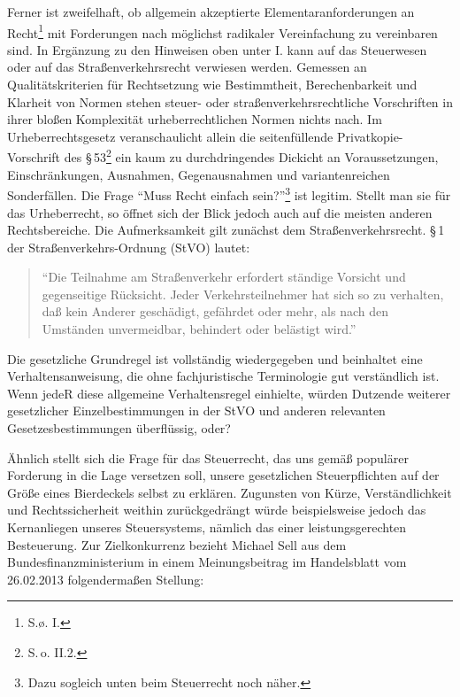 \documentclass[output=paper]{langscibook}
\begin{document}
Ferner ist zweifelhaft, ob allgemein akzeptierte Elementaranforderungen
an Recht\footnote{S.\o. I.} mit Forderungen nach möglichst radikaler
Vereinfachung zu vereinbaren sind. In Ergänzung zu den Hinweisen oben
unter I. kann auf das Steuerwesen oder auf das Straßenverkehrsrecht
verwiesen werden. Gemessen an Qualitätskriterien für Rechtsetzung wie
Bestimmtheit, Berechenbarkeit und Klarheit von Normen stehen steuer-
oder straßenverkehrsrechtliche Vorschriften in ihrer bloßen Komplexität
urheberrechtlichen Normen nichts nach. Im Urheberrechtsgesetz
veranschaulicht allein die seitenfüllende Privatkopie-Vorschrift des §\,53\footnote{S.\,o. II.2.} ein kaum zu durchdringendes Dickicht an
Voraussetzungen, Einschränkungen, Ausnahmen, Gegenausnahmen und
variantenreichen Sonderfällen. Die Frage \enquote{Muss Recht einfach
sein?}\footnote{Dazu sogleich unten beim Steuerrecht noch näher.} ist
legitim. Stellt man sie für das Urheberrecht, so öffnet sich der Blick
jedoch auch auf die meisten anderen Rechtsbereiche. Die Aufmerksamkeit
gilt zunächst dem Straßenverkehrsrecht. §\,1 der Straßen\-verkehrs-Ordnung
(StVO) lautet:

\begin{quote}
\enquote{Die Teilnahme am Straßenverkehr erfordert ständige Vorsicht und
gegenseitige Rücksicht. Jeder Verkehrsteilnehmer hat sich so zu
verhalten, daß kein Anderer geschädigt, gefährdet oder mehr, als nach
den Umständen unvermeidbar, behindert oder belästigt wird.}
\end{quote}

Die gesetzliche Grundregel ist vollständig wiedergegeben und beinhaltet
eine Verhaltensanweisung, die ohne fachjuristische Terminologie gut
verständlich ist. Wenn jedeR diese allgemeine Verhaltensregel einhielte,
würden Dutzende weiterer gesetzlicher Einzelbestimmungen in der StVO und
anderen relevanten Gesetzesbestimmungen überflüssig, oder?

Ähnlich stellt sich die Frage für das Steuerrecht, das uns gemäß
populärer Forderung in die Lage versetzen soll, unsere gesetzlichen
Steuerpflichten auf der Größe eines Bierdeckels selbst zu erklären.
Zugunsten von Kürze, Verständlichkeit und Rechtssicherheit weithin
zurückgedrängt würde beispielsweise jedoch das Kernanliegen unseres
Steuersystems, nämlich das einer leistungsgerechten Besteuerung. Zur
Zielkonkurrenz bezieht Michael Sell aus dem Bundesfinanzministerium in
einem Meinungsbeitrag im Handelsblatt vom 26.02.2013 folgendermaßen
Stellung:
\end{document}
